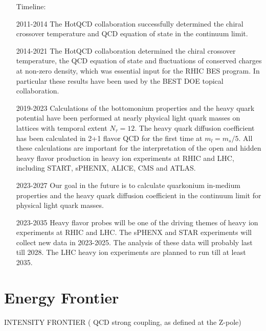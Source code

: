 \documentclass[prd,showpacs,showkeys,preprintnumbers,floatfix,
nofootinbib%
]{revtex4-2}
\begin{document}
\begin{itemize}
  \item[Timeline:]
   \item[2011-2014] The HotQCD collaboration successfully determined
     the chiral crossover temperature and QCD equation of state in the
     continuum limit. 
   \item[2014-2021] The HotQCD collaboration determined the chiral
     crossover temperature, the QCD equation of state and fluctuations
     of conserved charges at non-zero density, which was essential
     input for the RHIC BES program. In particular these results have
     been used by the BEST DOE topical collaboration.
   \item[2019-2023] Calculations of the bottomonium properties and the
     heavy quark potential have been performed at nearly physical
     light quark masses on lattices with temporal extent
     $N_{\tau}=12$. The heavy quark diffusion coefficient has been
     calculated in 2+1 flavor QCD for the first time at
     $m_l=m_s/5$. All these calculations are important for the
     interpretation of the open and hidden heavy flavor production in
     heavy ion experiments at RHIC and LHC, including START, sPHENIX,
     ALICE, CMS and ATLAS.
   \item[2023-2027] Our goal in the future is to calculate quarkonium
     in-medium properties and the heavy quark diffusion coefficient in
     the continuum limit for physical light quark masses.
   \item[2023-2035] Heavy flavor probes will be one of the driving
     themes of heavy ion experiments at RHIC and LHC. The sPHENX and
     STAR experiments will collect new data in 2023-2025. The analysis
     of these data will probably last till 2028. The LHC heavy ion
     experiments are planned to run till at least 2035. 
\end{itemize}


\section{Energy Frontier}\label{sec:energy}


INTENSITY FRONTIER  ( QCD strong coupling, as defined at the Z-pole)
\end{document}
